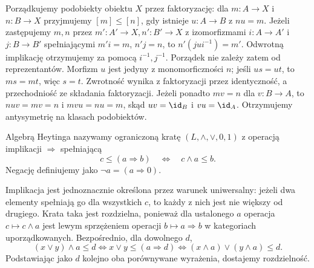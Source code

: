 Porządkujemy podobiekty obiektu $X$ przez faktoryzację: dla $m:A\to X$ i $n:B\to X$ przyjmujemy $[m]\leq[n]$, gdy istnieje $u:A\to B$ z $nu=m$. Jeżeli zastępujemy $m,n$ przez $m':A'\to X,n':B'\to X$ z izomorfizmami $i:A\to A'$ i $j:B\to B'$ spełniającymi $m'i=m$, $n'j=n$, to $n'(jui^{-1})=m'$. Odwrotną implikację otrzymujemy za pomocą $i^{-1},j^{-1}$. Porządek nie zależy zatem od reprezentantów. Morfizm $u$ jest jedyny z monomorficzności $n$; jeśli $us=ut$, to $ms=mt$, więc $s=t$. Zwrotność wynika z faktoryzacji przez identyczność, a przechodniość ze składania faktoryzacji. Jeżeli ponadto $mv=n$ dla $v:B\to A$, to $nuv=mv=n$ i $mvu=nu=m$, skąd $uv=\id_B$ i $vu=\id_A$. Otrzymujemy antysymetrię na klasach podobiektów.

\begin{definicja}\label{cat:def:heyting-algebra}
Algebrą Heytinga nazywamy ograniczoną kratę $(L,\wedge,\vee,0,1)$ z operacją implikacji $\Rightarrow$ spełniającą
\[
 c\leq(a\Rightarrow b)\quad\Longleftrightarrow\quad c\wedge a\leq b.
\]
Negację definiujemy jako $\neg a=(a\Rightarrow0)$.
\end{definicja}

Implikacja jest jednoznacznie określona przez warunek uniwersalny: jeżeli dwa elementy spełniają go dla wszystkich $c$, to każdy z nich jest nie większy od drugiego. Krata taka jest rozdzielna, ponieważ dla ustalonego $a$ operacja $c\mapsto c\wedge a$ jest lewym sprzężeniem operacji $b\mapsto a\Rightarrow b$ w kategoriach uporządkowanych. Bezpośrednio, dla dowolnego $d$,
\[
 (x\vee y)\wedge a\leq d
 \iff x\vee y\leq(a\Rightarrow d)
 \iff (x\wedge a)\vee(y\wedge a)\leq d.
\]
Podstawiając jako $d$ kolejno oba porównywane wyrażenia, dostajemy rozdzielność.

